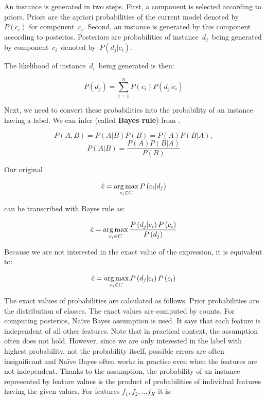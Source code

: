 An instance is generated in two steps.
First, a component is selected according to priors.
Priors are the apriori probabilities of the current model denoted by $P\left(c_i\right)$ for component~$c_i$.
Second, an instance is generated by this component according to posterios.
Posteriors are probabilities of instance~$d_j$~being generated by component~$c_i$~denoted by~$P\left(d_j|c_i\right)$.

The likelihood of instance~$d_i$~being generated is then:

\begin{equation}
	P\left(d_j\right) = \sum_{i=1}^{n}{
	P\left(c_i\right)
	P\left(d_j|c_i\right)
}
\end{equation}

Next, we need to convert these probabilities into the probability of an instance having a label.
We can infer  (called \textbf{Bayes rule}) from .

\begin{equation}
	\label{eq:bayesinfer}
	P\left(A,B\right) = 
	P\left(A|B\right)
	P\left(B\right) = 
	P\left(A\right)
	P\left(B|A\right),
\end{equation}
\begin{equation}
	\label{eq:bayesrule}
	P\left(A|B\right) =
	\frac{
	P\left(A\right)
P\left(B|A\right)}
{P\left(B\right)}
\end{equation}

Our original 

\begin{equation}
	\hat{c} = \operatorname*{arg\,max}_{c_i \in C} P\left(c_i  | d_j \right)
\end{equation}

can be transcribed with Bayes rule as:

\begin{equation}
	\hat{c} = \operatorname*{arg\,max}_{c_i \in C}
	\frac{
	P\left(d_j  | c_i \right)
	P\left( c_i \right)
}{
	P\left( d_j \right)
}
\end{equation}

Because we are not interested in the exact value of the expression, it is equivalent to:

\begin{equation}
	\label{eq:classprb}
	\hat{c} = \operatorname*{arg\,max}_{c_i \in C}
	P\left(d_j  | c_i \right)
	P\left( c_i \right)
\end{equation}

The exact values of probabilities are calculated as follows.
Prior probabilities are the distribution of classes.
The exact values are computed by counts.
For computing posterios, Na\"{i}ve Bayes assumption is used.
It says that each feature is independent of all other features.
Note that in practical context, the assumption often does not hold.
However, since we are only interested in the label with highest probability,
not the probability itself, possible errors are often insignificant and Na\"{i}ve Bayes often works in practise even when the features are not independent.
Thanks to the assumption, the probability of an instance represented by feature values is the product
of probabilities of individual features having the given values.
For features $f_1, f_2, \dots f_K$ it is:

